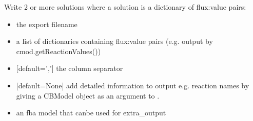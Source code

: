 \documentclass[letterpaper,10pt,english]{sphinxmanual}
\begin{document}
\begin{fulllineitems}
\label{\detokenize{modules_doc:cbmpy.CBWrite.writeSolutions}}
\pysigstartsignatures
{}
\pysigstopsignatures
\sphinxAtStartPar
Write 2 or more solutions where a solution is a dictionary of flux:value pairs:
\begin{itemize}
\item {} 
\sphinxAtStartPar
{} the export filename

\item {} 
\sphinxAtStartPar
{} a list of dictionaries containing flux:value pairs (e.g. output by cmod.getReactionValues())

\item {} 
\sphinxAtStartPar
{} {[}default=’,’{]} the column separator

\item {} 
\sphinxAtStartPar
{} {[}default=None{]} add detailed information to output e.g. reaction names by giving a CBModel object as an argument to .

\item {} 
\sphinxAtStartPar
{} an fba model that canbe used for extra\_output

\end{itemize}

\end{fulllineitems}

\end{document}
